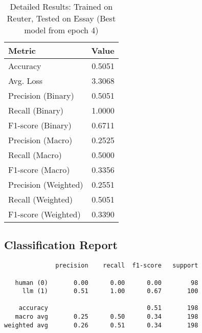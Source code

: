 \documentclass{article}
\begin{document}
\begin{table}[htbp]
\centering
\caption*{Detailed Results: Trained on Reuter, Tested on Essay (Best model from epoch 4)}
\begin{tabular}{@{}lr@{}}
\toprule
Metric & Value \\
\midrule
Accuracy & 0.5051 \\
Avg. Loss & 3.3068 \\
Precision (Binary) & 0.5051 \\
Recall (Binary) & 1.0000 \\
F1-score (Binary) & 0.6711 \\
Precision (Macro) & 0.2525 \\
Recall (Macro) & 0.5000 \\
F1-score (Macro) & 0.3356 \\
Precision (Weighted) & 0.2551 \\
Recall (Weighted) & 0.5051 \\
F1-score (Weighted) & 0.3390 \\
\bottomrule
\end{tabular}
\subsection*{Classification Report}
\begin{verbatim}
              precision    recall  f1-score   support

   human (0)       0.00      0.00      0.00        98
     llm (1)       0.51      1.00      0.67       100

    accuracy                           0.51       198
   macro avg       0.25      0.50      0.34       198
weighted avg       0.26      0.51      0.34       198
\end{verbatim}
\end{table}
\end{document}
